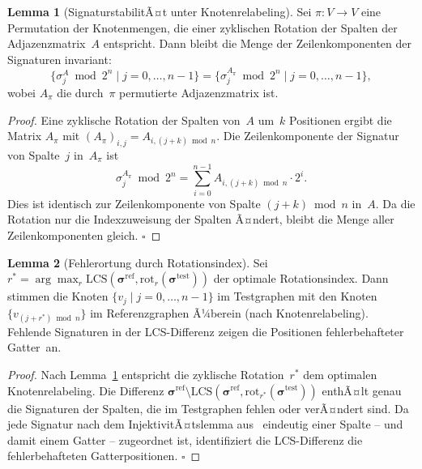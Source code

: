 ﻿\documentclass[a4paper,12pt]{article}
\theoremstyle{definition}
\newtheorem{lemma}{Lemma}
\begin{document}
\begin{lemma}[SignaturstabilitÃ¤t unter Knotenrelabeling]
  \label{lem:relabeling}
  Sei $\pi: V \to V$ eine Permutation der Knotenmengen, die einer
  zyklischen Rotation der Spalten der Adjazenzmatrix~$A$ entspricht.
  Dann bleibt die Menge der Zeilenkomponenten der Signaturen invariant:
  \[
    \bigl\{\sigma_j^A \bmod 2^n \mid j = 0, \ldots, n-1\bigr\}
    = \bigl\{\sigma_j^{A_\pi} \bmod 2^n \mid j = 0, \ldots, n-1\bigr\},
  \]
  wobei $A_\pi$ die durch~$\pi$ permutierte Adjazenzmatrix ist.
\end{lemma}

\begin{proof}
  Eine zyklische Rotation der Spalten von~$A$ um~$k$ Positionen ergibt
  die Matrix $A_\pi$ mit $(A_\pi)_{i,j} = A_{i,(j+k)\bmod n}$.
  Die Zeilenkomponente der Signatur von Spalte~$j$ in~$A_\pi$ ist
  \[
    \sigma_j^{A_\pi} \bmod 2^n
    = \sum_{i=0}^{n-1} A_{i,(j+k)\bmod n} \cdot 2^i.
  \]
  Dies ist identisch zur Zeilenkomponente von Spalte
  $(j+k) \bmod n$ in~$A$.
  Da die Rotation nur die Indexzuweisung der Spalten Ã¤ndert, bleibt
  die Menge aller Zeilenkomponenten gleich. $\square$
\end{proof}

\begin{lemma}[Fehlerortung durch Rotationsindex]
  \label{lem:fehlerortung}
  Sei $r^* = \arg\max_{r} \mathrm{LCS}(\boldsymbol{\sigma}^{\mathrm{ref}},
  \mathrm{rot}_r(\boldsymbol{\sigma}^{\mathrm{test}}))$ der optimale
  Rotationsindex.
  Dann stimmen die Knoten $\{v_j \mid j = 0, \ldots, n-1\}$ im
  Testgraphen mit den Knoten $\{v_{(j+r^*)\bmod n}\}$ im
  Referenzgraphen Ã¼berein (nach Knotenrelabeling).
  Fehlende Signaturen in der LCS-Differenz zeigen die Positionen
  fehler\-behafteter Gatter~an.
\end{lemma}

\begin{proof}
  Nach Lemma~\ref{lem:relabeling} entspricht die zyklische Rotation~$r^*$
  dem optimalen Knotenrelabeling.
  Die Differenz
  $\boldsymbol{\sigma}^{\mathrm{ref}} \setminus
  \mathrm{LCS}(\boldsymbol{\sigma}^{\mathrm{ref}},
  \mathrm{rot}_{r^*}(\boldsymbol{\sigma}^{\mathrm{test}}))$
  enthÃ¤lt genau die Signaturen der Spalten, die im Testgraphen fehlen
  oder verÃ¤ndert sind.
  Da jede Signatur nach dem InjektivitÃ¤ts\-lemma aus~\cite{epp2026subgraph}
  eindeutig einer Spalte -- und damit einem Gatter -- zugeordnet ist,
  identifiziert die LCS-Differenz die fehler\-behafteten Gatter\-positionen.
  $\square$
\end{proof}
\end{document}
